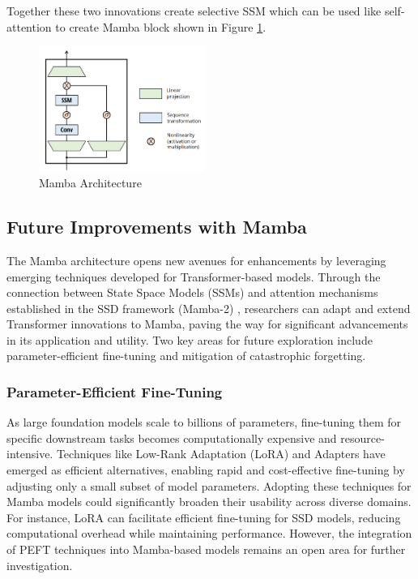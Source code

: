 \documentclass[12pt, conference, compsoc, onecolumn]{IEEEtran}
\begin{document}
	Together these two innovations create selective SSM which can be used like self-attention to create Mamba block shown in Figure \ref{fig:mamba_arch}.
	\begin{figure}[H]
		\centering
		\includegraphics[width=0.48\textwidth]{figures/mamba_arch.png}
		\caption{Mamba Architecture\cite{gu2024mamba}}
		\label{fig:mamba_arch}
	\end{figure}
	
	\subsection{Future Improvements with Mamba}
	The Mamba architecture opens new avenues for enhancements by leveraging emerging techniques developed for Transformer-based models. Through the connection between State Space Models (SSMs) and attention mechanisms established in the SSD framework (Mamba-2) \cite{dao2024transformersssmsgeneralizedmodels}, researchers can adapt and extend Transformer innovations to Mamba, paving the way for significant advancements in its application and utility. Two key areas for future exploration include parameter-efficient fine-tuning and mitigation of catastrophic forgetting.
	
	\subsubsection*{Parameter-Efficient Fine-Tuning}
	
	As large foundation models scale to billions of parameters, fine-tuning them for specific downstream tasks becomes computationally expensive and resource-intensive. Techniques like Low-Rank Adaptation (LoRA) and Adapters have emerged as efficient alternatives, enabling rapid and cost-effective fine-tuning by adjusting only a small subset of model parameters. Adopting these techniques for Mamba models could significantly broaden their usability across diverse domains. For instance, LoRA can facilitate efficient fine-tuning for SSD models, reducing computational overhead while maintaining performance. However, the integration of PEFT techniques into Mamba-based models remains an open area for further investigation.
	
\end{document}
